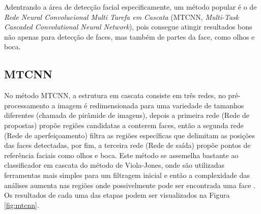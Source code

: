 Adentrando a área de detecção facial especificamente, um método popular é o de \textit{Rede Neural Convolucional Multi Tarefa em Cascata} (MTCNN, \textit{Multi-Task Cascaded Convolutional Neural Network}), pois consegue atingir resultados bons não apenas para detecção de faces, mas também de partes da face, como olhos e boca. \cite{mtcnn}

\subsection{MTCNN}

No método MTCNN, a estrutura em cascata consiste em três redes, no pré-processamento a imagem é redimensionada para uma variedade de tamanhos diferentes (chamada de pirâmide de imagens), depois a primeira rede (Rede de propostas) propõe regiões candidatas a conterem faces, então a segunda rede (Rede de aperfeiçoamento) filtra as regiões específicas que delimitam as posições das faces detectadas, por fim, a terceira rede (Rede de saída) propõe pontos de referência faciais como olhos e boca. Este método se assemelha bastante ao classificador em cascata do método de Viola-Jones, onde são utilizadas ferramentas mais simples para um filtragem inicial e então a complexidade das análises aumenta nas regiões onde possivelmente pode ser encontrada uma face \cite{mtcnn}. Os resultados de cada uma das etapas podem ser visualizados na Figura \ref{fig:mtcnn}.

